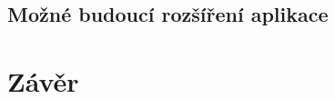 \section{Možné budoucí rozšíření aplikace}

\cite{Beran}




\chapter{Závěr}

\dummyShortText[8]

\dummyText[2]





%

